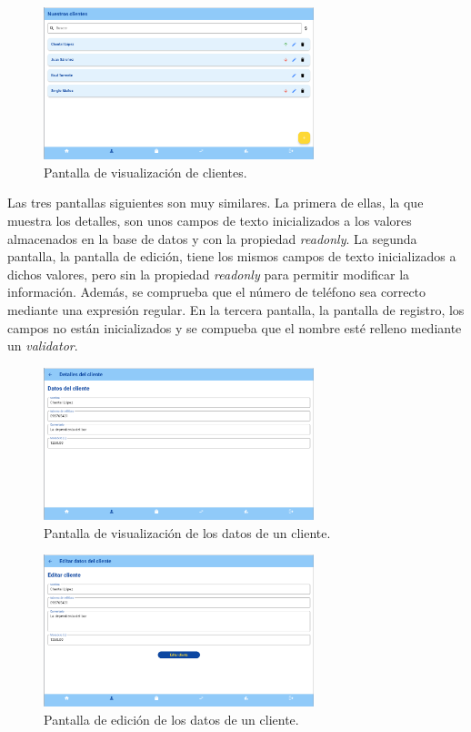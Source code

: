 \begin{figure}[H]
	\centering
	\includegraphics[width=0.7\textwidth]{imagenes/TerceraIteracion/clientView.png}
	\caption{Pantalla de visualización de clientes.}
\end{figure}

Las tres pantallas siguientes son muy similares. La primera de ellas, la que muestra los detalles, son unos campos de texto inicializados a los valores almacenados en la base de datos y con la propiedad \textit{readonly}. La segunda pantalla, la pantalla de edición, tiene los mismos campos de texto inicializados a dichos valores, pero sin la propiedad \textit{readonly} para permitir modificar la información. Además, se comprueba que el número de teléfono sea correcto mediante una expresión regular. En la tercera pantalla, la pantalla de registro, los campos no están inicializados y se compueba que el nombre esté relleno mediante un \textit{validator}.  

\begin{figure}[H]
	\centering
	\includegraphics[width=0.7\textwidth]{imagenes/TerceraIteracion/clientDetails.png}
	\caption{Pantalla de visualización de los datos de un cliente.}
\end{figure}

\begin{figure}[H]
	\centering
	\includegraphics[width=0.7\textwidth]{imagenes/TerceraIteracion/clientEdit.png}
	\caption{Pantalla de edición de los datos de un cliente.}
\end{figure}

